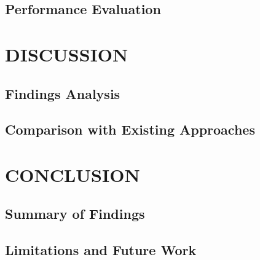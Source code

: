 \documentclass{SOICTthesis}  %
\begin{document}
\section{Performance Evaluation}
\lipsum[31-33]
\cite{b10, b11}


\chapter{DISCUSSION}
\section{Findings Analysis}
\lipsum[34-36]

\section{Comparison with Existing Approaches}
\lipsum[37-39]
\cite{b12}

\chapter{CONCLUSION}
\section{Summary of Findings}
\lipsum[40-42]

\section{Limitations and Future Work}
\lipsum[43-45]


\newpage


%
\end{document}
